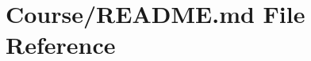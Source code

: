 \hypertarget{Course_2README_8md}{\section{Course/\-R\-E\-A\-D\-M\-E.md File Reference}
\label{Course_2README_8md}
}
